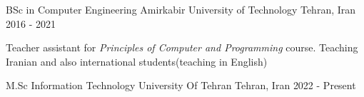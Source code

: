

\begin{cventries}

  \cventry
    {BSc in Computer Engineering} %
    {Amirkabir University of Technology} %
    {Tehran, Iran} %
    {2016 - 2021} %
    {
      \begin{cvitems} %
        \item {Teacher assistant for \textit{Principles of Computer and Programming} course. 
        Teaching Iranian and also international students(teaching in English)}
      \end{cvitems}
    }
    
  \cventry
    {M.Sc Information Technology} %
    {University Of Tehran} %
    {Tehran, Iran} %
    {2022 - Present} %
    {}
    
\end{cventries}

